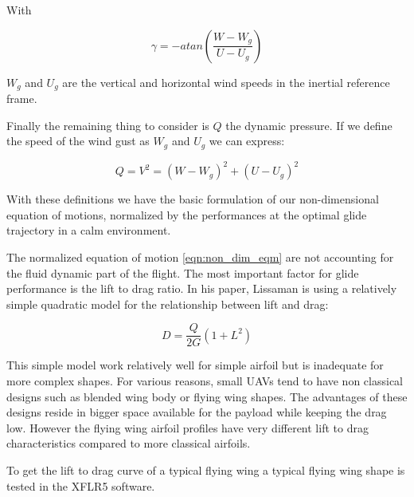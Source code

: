 With 

\begin{equation}
	\gamma = -atan(\frac{W-W_g}{U-U_g})
	\label{eqn:gamma_def}
\end{equation}

$W_g$ and $U_g$ are the vertical and horizontal wind speeds in the inertial reference frame.

\par Finally the remaining thing to consider is $Q$ the dynamic pressure. If we define the speed of the wind gust as $W_g$ and $U_g$ we can express:

\begin{equation}
	Q = V^2 = (W-W_g)^2 + (U-U_g)^2
	\label{eqn:q_def}
\end{equation}

\par With these definitions we have the basic formulation of our non-dimensional equation of motions, normalized by the performances at the optimal glide trajectory in a calm environment.


\par The normalized equation of motion \ref{eqn:non_dim_eqm} are not accounting for the fluid dynamic part of the flight.
The most important factor for glide performance is the lift to drag ratio. 
In his paper, Lissaman \cite{Lissaman2007neutral} is using a relatively simple quadratic model for the relationship between lift and drag:

\begin{equation}
	D=\frac{Q}{2G}(1+L^2)
	\label{eqn:Lissaman_G}
\end{equation}


\par This simple model work relatively well for simple airfoil but is inadequate for more complex shapes.
For various reasons, small UAVs tend to have non classical designs such as blended wing body or flying wing shapes.
The advantages of these designs reside in bigger space available for the payload while keeping the drag low.
However the flying wing airfoil profiles have very different lift to drag characteristics compared to more classical airfoils.

\par To get the lift to drag curve of a typical flying wing a typical flying wing shape is tested in the XFLR5 software.

